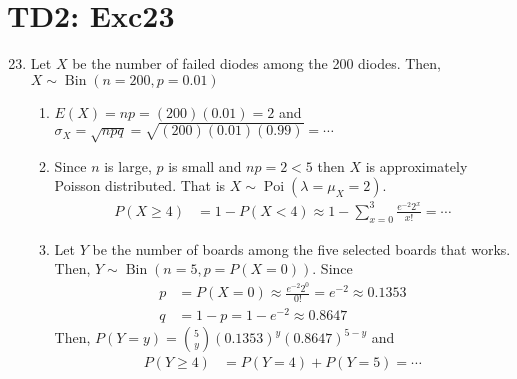 \documentclass[serif,t]{beamer}
\begin{document}
    \section{TD2: Exc23}
    \begin{frame}[allowframebreaks]
        \begin{enumerate}
            \setcounter{enumi}{22}
            \item Let $ X $ be the number of failed diodes among the 200 diodes. Then, $ X\sim\operatorname{Bin}(n=200,p=0.01) $
            \begin{enumerate}[a]
                \item $ E(X)=np=(200)(0.01)=2 $ and $ \sigma_{X}=\sqrt{npq}=\sqrt{(200)(0.01)(0.99)}=\cdots $
                \item Since $ n $ is large, $ p $ is small and $ np=2<5 $ then $ X $ is approximately Poisson distributed. That is $ X\sim\operatorname{Poi}(\lambda=\mu_{X}=2). $
                \begin{align*}
                P(X\geq 4) &=1-P(X<4)\approx 1-\sum_{x=0}^{3} \frac{e^{-2}2^{x}}{x!}=\cdots
                \end{align*}
                \item Let $ Y $ be the number of boards among the five selected boards that works. Then, $ Y\sim\operatorname{Bin}(n=5,p=P(X=0)). $ Since
                \begin{align*}
                p &=P(X=0)\approx \frac{e^{-2}2^{0}}{0!}=e^{-2}\approx 0.1353\\
                q &=1-p=1-e^{-2}\approx 0.8647
                \end{align*}
                Then, $ P(Y=y)=\binom{5}{y}(0.1353)^{y}(0.8647)^{5-y} $ and
                \begin{align*}
                P(Y\geq 4) &=P(Y=4)+P(Y=5)=\cdots
                \end{align*}
            \end{enumerate}
        \end{enumerate}
    \end{frame}
\end{document}
